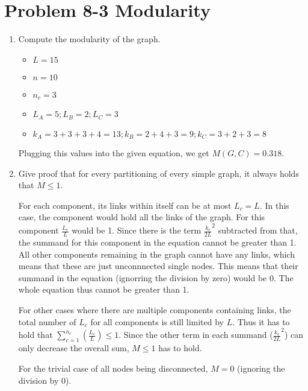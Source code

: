 \section*{Problem 8-3 Modularity}

\begin{enumerate}
	\item Compute the modularity of the graph.
	\begin{itemize}
		\item $L = 15$
		\item $n = 10$
		\item $n_c = 3$
		\item $L_A = 5 ; L_B = 2 ; L_C = 3$
		\item $k_A = 3 + 3 + 3 + 4 = 13 ; k_B = 2 + 4 + 3 = 9 ; k_C = 3 + 2 + 3 = 8$
	\end{itemize}
	
	Plugging this values into the given equation, we get $M(G,C) = 0.318$.
	
	\item Give proof that for every partitioning of every simple graph, it always holds that $M \leq 1$.
	
	For each component, its links within itself can be at most $L_c = L$. In this case, the component would hold all the links of the graph. For this component $\frac{L_c}{L}$ would be 1.  Since there is the term $\frac{k_c}{2L}^2$ subtracted from that, the summand for this component in the equation cannot be greater than 1. All other components remaining in the graph cannot have any links, which means that these are just unconnnected single nodes.  This means that their summand in the equation (ignorring the division by zero) would be 0. The whole equation thus cannot be greater than 1.
	
	For other cases where there are multiple components containing links, the total number of $L_c$ for all components is still limited by $L$. Thus it has to hold that $\sum^{n_c}_{c=1}(\frac{L_c}{L}) \leq 1$. Since the other term in each summand ($\frac{k_c}{2L}^2$) can only decrease the overall sum, $M \leq 1$ has to hold.
	
	For the trivial case of all nodes being disconnected, $M = 0$ (ignoring the division by 0).
	
\end{enumerate}